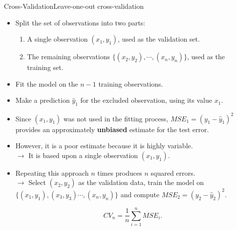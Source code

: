 \begin{frame}{Cross-Validation}{Leave-one-out cross-validation}

\begin{itemize}
    \item Split the set of observations into two parts: \pause 
    \begin{enumerate}
        \item A single observation $(x_1 , y_1 )$, used as the validation set. \pause
        \item The remaining observations $\{(x_2 , y_2 ), \cdots , (x_n, y_n )\}$, used as the training set. \pause
    \end{enumerate}
    
    \item Fit the model on the $n - 1$ training observations. \pause 
    
    \item Make a prediction $\hat{y}_1$ for the excluded observation, using its value $x_1$. \pause

    \item Since $(x_1 , y_1)$ was not used in the fitting process, $MSE_1 = (y_1 - \hat{y}_1 )^2$ provides an approximately \textbf{unbiased} estimate for the test error. \pause 
    
    \item However, it is a poor estimate because it is highly variable. \pause \\  
    $\rightarrow$ It is based upon a single observation $(x_1 , y_1)$. \pause

    \item Repeating this approach $n$ times produces $n$ squared errors. \pause \\
    $\rightarrow$  Select $(x_2 , y_2 )$ as the validation data, train the model on $\{(x_1 , y_1 ), (x_3 , y_3 ) \cdots , (x_n, y_n )\}$ and compute $MSE_2 = (y_2 - \hat{y}_2 )^2$. \pause
 
    \begin{equation}
        CV_{n} = \frac{1}{n} \sum_{i=1}^n MSE_i. 
    \end{equation}
    
\end{itemize}
    
\end{frame}


